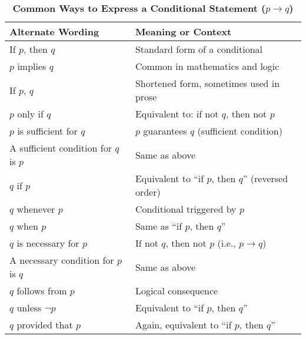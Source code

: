 \begin{table}[h!]
\centering
\caption*{\textbf{Common Ways to Express a Conditional Statement ($p \rightarrow q$)}}
\begin{tabular}{|p{6.5cm}|p{6.5cm}|}
\hline
\rowcolor{gray!20}
\textbf{Alternate Wording} & \textbf{Meaning or Context} \\
\hline
If $p$, then $q$ & Standard form of a conditional \\
$p$ implies $q$ & Common in mathematics and logic \\
If $p$, $q$ & Shortened form, sometimes used in prose \\
$p$ only if $q$ & Equivalent to: if not $q$, then not $p$ \\
$p$ is sufficient for $q$ & $p$ guarantees $q$ (sufficient condition) \\
A sufficient condition for $q$ is $p$ & Same as above \\
$q$ if $p$ & Equivalent to “if $p$, then $q$” (reversed order) \\
$q$ whenever $p$ & Conditional triggered by $p$ \\
$q$ when $p$ & Same as “if $p$, then $q$” \\
$q$ is necessary for $p$ & If not $q$, then not $p$ (i.e., $p \rightarrow q$) \\
A necessary condition for $p$ is $q$ & Same as above \\
$q$ follows from $p$ & Logical consequence \\
$q$ unless $\neg p$ & Equivalent to “if $p$, then $q$” \\
$q$ provided that $p$ & Again, equivalent to “if $p$, then $q$” \\
\hline
\end{tabular}
\end{table}

